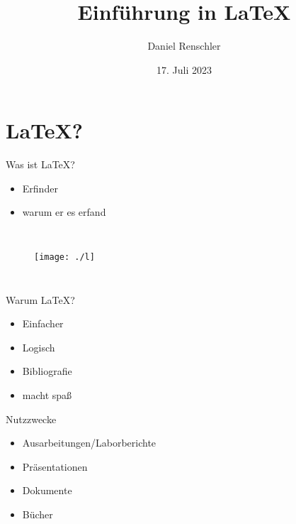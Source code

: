 \documentclass{beamer}
\title{Einf\"uhrung in \LaTeX}
\author{Daniel Renschler}
\date{17. Juli 2023}
\begin{document}
\begin{frame}
    \titlepage 
\end{frame}




\begin{frame}
    \tableofcontents
\end{frame}



\section{\LaTeX?}
\begin{frame}{Was ist \LaTeX?}
    \begin{itemize}
        \item Erfinder
        \item warum er es erfand
    \end{itemize}

    \begin{columns}
        
        \begin{figure}[htpb]
            \centering
            \texttt{[image: ./l]}
            \caption{}
        \end{figure}
    \end{columns}

\end{frame}



\begin{frame}{Warum \LaTeX?}
    \begin{itemize}
        \item Einfacher
        \item Logisch
        \item Bibliografie
        \item macht spa\ss
    \end{itemize}

\end{frame}



\begin{frame}{Nutzzwecke}

    \begin{itemize}
        \item Ausarbeitungen/Laborberichte
        \item Pr\"asentationen
        \item Dokumente
        \item B\"ucher
    \end{itemize}
\end{frame}
\end{document}
